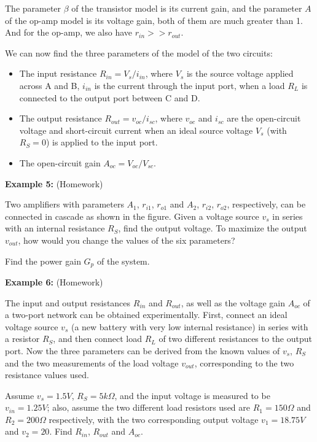 \documentclass{article}
\begin{document}

The parameter $\beta$ of the transistor model is its current gain,
and the parameter $A$ of the op-amp model is its voltage gain, both
of them are much greater than 1. And for the op-amp, we also have
$r_{in}>>r_{out}$.

We can now find the three parameters of the model of the two circuits:

\begin{itemize}
\item The input resistance $R_{in}=V_s/i_{in}$, where $V_s$ is the source
  voltage applied across A and B, $i_{in}$ is the current through the 
  input port, when a load $R_L$ is connected to the output port between
  C and D.
\item The output resistance $R_{out}=v_{oc}/i_{sc}$, where $v_{oc}$ and
  $i_{sc}$ are the open-circuit voltage and short-circuit current when
  an ideal source voltage $V_s$ (with $R_S=0$) is applied to the input 
  port.
\item The open-circuit gain $A_{oc}=V_{oc}/V_{sc}$.
\end{itemize}



{\bf Example 5:} (Homework)


Two amplifiers with parameters $A_1$, $r_{i1}$, $r_{o1}$ and $A_2$, $r_{i2}$, 
$r_{o2}$, respectively, can be connected in cascade as shown in the figure. 
Given a voltage source $v_s$ in series with an internal resistance $R_S$,
find the output voltage. To maximize the output $v_{out}$, how would you 
change the values of the six parameters?

Find the power gain $G_p$ of the system.



{\bf Example 6:} (Homework)

The input and output resistances $R_{in}$ and $R_{out}$, as well as the voltage 
gain $A_{oc}$ of a two-port network can be obtained experimentally. First,
connect an ideal voltage source $v_s$ (a new battery with very low internal
resistance) in series with a resistor $R_S$, and then connect load $R_L$ of
two different resistances to the output port. Now the three parameters can
be derived from the known values of $v_s$, $R_S$ and the two measurements of
the load voltage $v_{out}$, corresponding to the two resistance values used.

Assume $v_s=1.5V$, $R_S=5 k\Omega$, and the input voltage is measured to be 
$v_{in}=1.25 V$; also, assume the two different load resistors used are 
$R_1=150 \Omega$ and $R_2=200 \Omega$ respectively, with the two corresponding
output voltage $v_1=18.75V$ and $v_2=20$. Find $R_{in}$, $R_{out}$ and $A_{oc}$.

\end{document}
